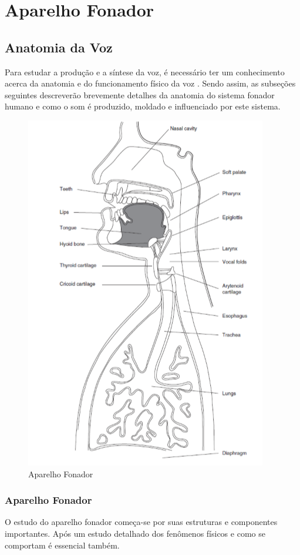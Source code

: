 
\chapter{Aparelho Fonador}
\section{Anatomia da Voz}
	Para estudar a produção e a síntese da voz, é necessário ter um conhecimento acerca da anatomia e do funcionamento físico da voz . Sendo assim, as subseções seguintes descreverão brevemente detalhes da anatomia do sistema fonador humano e como o som é produzido, moldado e inﬂuenciado por este sistema.
	
	\begin{figure}
		\centering
		\includegraphics[scale=0.5]{aparelhoFonador}
		\caption{Aparelho Fonador}
		\label{fig:aparelhoFonador}
	\end{figure}
	\subsection{Aparelho Fonador}
	O estudo do aparelho fonador começa-se por suas estruturas e componentes importantes. Após um estudo detalhado dos fenômenos físicos e como se comportam é essencial também.
		
